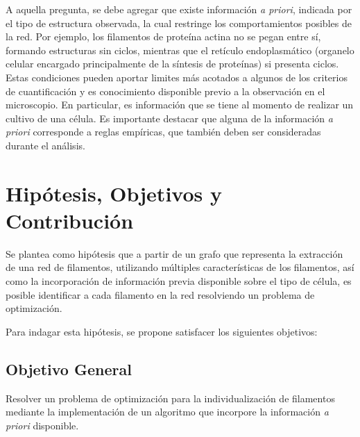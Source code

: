 \documentclass{article}
\begin{document}
A aquella pregunta, se debe agregar que existe informaci\'on \textit{a priori}, indicada por el tipo de estructura observada, la cual restringe los comportamientos posibles de la red. Por ejemplo, los filamentos de prote\'ina actina no se pegan entre s\'i, formando estructuras sin ciclos, mientras que el ret\'iculo endoplasm\'atico (organelo celular encargado principalmente de la s\'intesis de prote\'inas) si presenta ciclos. Estas condiciones pueden aportar limites m\'as acotados a algunos de los criterios de cuantificaci\'on y es conocimiento disponible previo a la observaci\'on en el microscopio. En particular, es informaci\'on que se tiene al momento de realizar un cultivo de una c\'elula. 
Es importante destacar que alguna de la informaci\'on {\it a priori} corresponde a reglas emp\'iricas, que tambi\'en deben ser consideradas durante el an\'alisis.




\section{Hipótesis, Objetivos y Contribuci\'on}
\label{hipotesis}

Se plantea como hip\'otesis que a partir de un grafo que representa la extracci\'on de una red de filamentos, utilizando m\'ultiples caracter\'isticas de los filamentos, as\'i como la incorporaci\'on de informaci\'on previa disponible sobre el tipo de c\'elula, es posible identificar a cada filamento en la red resolviendo un problema de optimizaci\'on.


Para indagar esta hip\'otesis, se propone satisfacer los siguientes objetivos:
\subsection{Objetivo General}
Resolver un problema de optimizaci\'on para la individualizaci\'on de filamentos mediante la implementaci\'on de un algoritmo que incorpore la informaci\'on {\it a priori} disponible.
\end{document}
